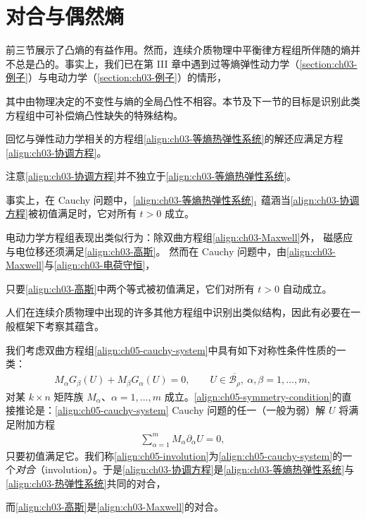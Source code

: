 \documentclass[../../main.tex]{subfiles}
\begin{document}
\section{对合与偶然熵}\label{section:ch05-对合与偶然熵}

前三节展示了凸熵的有益作用。然而，连续介质物理中平衡律方程组所伴随的熵并不总是凸的。事实上，我们已在第 III 章中遇到过等熵弹性动力学（\cref{section:ch03-例子}）与电动力学（\cref{section:ch03-例子}）的情形，

其中由物理决定的不变性与熵的全局凸性不相容。本节及下一节的目标是识别此类方程组中可补偿熵凸性缺失的特殊结构。

回忆与弹性动力学相关的方程组\eqref{align:ch03-等熵热弹性系统}的解还应满足方程\eqref{align:ch03-协调方程}。

注意\eqref{align:ch03-协调方程}并不独立于\eqref{align:ch03-等熵热弹性系统}。

事实上，在 Cauchy 问题中，\eqref{align:ch03-等熵热弹性系统}$_{1}$
蕴涵当\eqref{align:ch03-协调方程}被初值满足时，它对所有 $t>0$ 成立。

电动力学方程组表现出类似行为：除双曲方程组\eqref{align:ch03-Maxwell}外，
磁感应与电位移还须满足\eqref{align:ch03-高斯}。
然而在 Cauchy 问题中，由\eqref{align:ch03-Maxwell}与\eqref{align:ch03-电荷守恒}，

只要\eqref{align:ch03-高斯}中两个等式被初值满足，它们对所有 $t>0$ 自动成立。

人们在连续介质物理中出现的许多其他方程组中识别出类似结构，因此有必要在一般框架下考察其蕴含。

我们考虑双曲方程组\eqref{align:ch05-cauchy-system}中具有如下对称性条件性质的一类：
\begin{align}
M_{\alpha}G_{\beta}(U)+M_{\beta}G_{\alpha}(U)=0,\qquad U\in\overline{\mathscr{B}_{\rho}},\ \alpha,\beta=1,\ldots,m,\label{align:ch05-symmetry-condition}
\end{align}
对某 $k\times n$ 矩阵族 $M_{\alpha}$、$\alpha=1,\ldots,m$ 成立。\eqref{align:ch05-symmetry-condition}的直接推论是：\eqref{align:ch05-cauchy-system} Cauchy 问题的任一（一般为弱）解 $U$ 将满足附加方程
\begin{align}
\sum_{\alpha=1}^{m}M_{\alpha}\partial_{\alpha}U=0,\label{align:ch05-involution}
\end{align}
只要初值满足它。我们称\eqref{align:ch05-involution}为\eqref{align:ch05-cauchy-system}的一个\emph{对合}（involution）。于是\eqref{align:ch03-协调方程}是\eqref{align:ch03-等熵热弹性系统}与\eqref{align:ch03-热弹性系统}共同的对合，


而\eqref{align:ch03-高斯}是\eqref{align:ch03-Maxwell}的对合。
\end{document}
